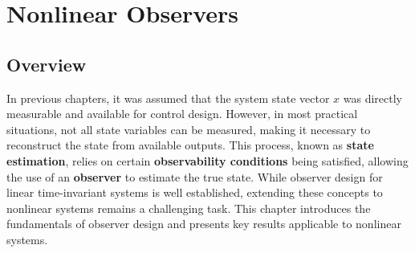 \chapterspaceabove{6.75cm} %
\chapterspacebelow{7.25cm} %

\chapter{Nonlinear Observers}
\section{Overview}
In previous chapters, it was assumed that the system state vector $x$ was directly measurable and available for control design. However, in most practical situations, not all state variables can be measured, making it necessary to reconstruct the state from available outputs. This process, known as \textbf{state estimation}, relies on certain \textbf{observability conditions} being satisfied, allowing the use of an \textbf{observer} to estimate the true state. While observer design for linear time-invariant systems is well established, extending these concepts to nonlinear systems remains a challenging task. This chapter introduces the fundamentals of observer design and presents key results applicable to nonlinear systems.